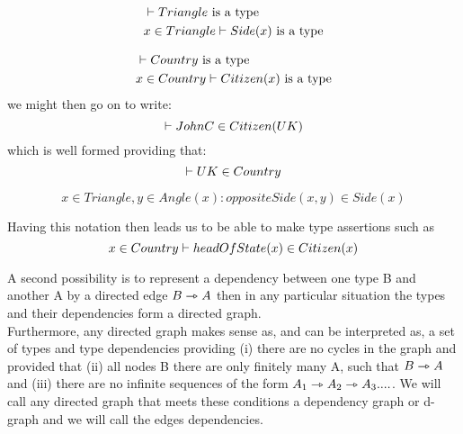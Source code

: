 \begin{frame}
\begin{align*}
&\vdash Triangle\mbox{ is a type} \\
&x \in Triangle \vdash Side(x)\mbox{ is a type} 
\end{align*}  

\begin{align*}
&\vdash Country\mbox{ is a type} \\
&x \in Country \vdash Citizen(x) \mbox{ is a type}
\end{align*}
\noindent we might then go on to write: 
\begin{equation*}
\vdash JohnC \in Citizen(UK)
\end{equation*}
which is well formed providing that:
\begin{equation*}
\vdash UK \in Country
\end{equation*}
\end{frame}

\begin{frame}
\begin{equation*}
x \in Triangle, y \in Angle(x): oppositeSide(x,y) \in Side(x)
\end{equation*}

\noindent Having this notation then leads us to be able to make type assertions such as
\begin{equation*}
x \in Country \vdash headOfState(x) \in Citizen(x)
\end{equation*}
\end{frame}

\begin{frame}
\noindent A second possibility is to represent a dependency between one type B and another A by a directed 
edge $B \rightarrowtriangle A$ then in any particular 
situation the types and their dependencies form a directed graph.
\\

\noindent Furthermore, any directed graph makes sense as, and can be interpreted as, a set of types and type dependencies 
providing (i) there are no cycles in
the graph and provided that (ii) all nodes B there are only finitely many A, such that $B \rightarrowtriangle A$ and (iii) there are 
no infinite sequences of the form $A_1 \rightarrowtriangle A_2 \rightarrowtriangle A_3 ....$. We will call any directed graph that 
meets these conditions a dependency graph or  d-graph and we will call the edges dependencies. 
\end{frame}

